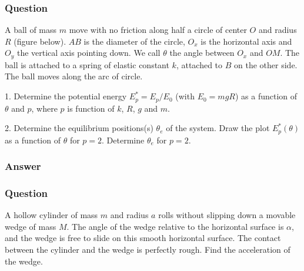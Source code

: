 \subsubsection{Question}

A ball of mass $m$ move with no friction along half a circle of center $O$ and radius $R$ (figure below). $AB$ is the diameter of the circle, $O_x$ is the horizontal axis and $O_y$ the vertical axis pointing down. We call $\theta$ the angle between $O_x$ and $OM$. The ball is attached to a spring of elastic constant $k$, attached to $B$ on the other side. The ball moves along the arc of circle.

1. Determine the potential energy $E_p^* = E_p/E_0$ (with $E_0 = mgR$) as a function of $\theta$ and $p$, where $p$ is function of $k$, $R$, $g$ and $m$.

2. Determine the equilibrium positions(s) $\theta_e$ of the system. Draw the plot $E_p^*(\theta)$ as a function of $\theta$ for $p = 2$. Determine $\theta_e$ for $p = 2$.
\subsubsection{Answer}


\subsubsection{Question}
A hollow cylinder of mass $m$ and radius $a$ rolls without slipping down a movable wedge of mass $M$. The angle of the wedge relative to the horizontal surface is $\alpha$, and the wedge is free to slide on this smooth horizontal surface. The contact between the cylinder and the wedge is perfectly rough. Find the acceleration of the wedge.
